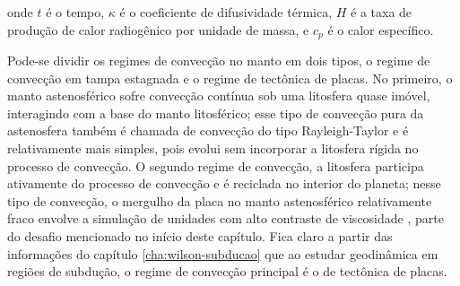 \noindent onde $t$ é o tempo, $\kappa$ é o coeficiente de difusividade térmica, $H$ é a taxa de produção de calor radiogênico por unidade de massa, e $c_p$ é o calor específico.

Pode-se dividir os regimes de convecção no manto em dois tipos, o regime de convecção em tampa estagnada e o regime de tectônica de placas. No primeiro, o manto astenosférico sofre convecção contínua sob uma litosfera quase imóvel, interagindo com a base do manto litosférico; esse tipo de convecção pura da astenosfera também é chamada de convecção do tipo Rayleigh-Taylor e é relativamente mais simples, pois evolui sem incorporar a litosfera rígida no processo de convecção. O segundo regime de convecção, a litosfera participa ativamente do processo de convecção e é reciclada no interior do planeta; nesse tipo de convecção, o mergulho da placa no manto astenosférico relativamente fraco envolve a simulação de unidades com alto contraste de viscosidade \citep{korenaga2013initiation,gerya2019introduction}, parte do desafio mencionado no início deste capítulo. Fica claro a partir das informações do capítulo \ref{cha:wilson-subducao} que ao estudar geodinâmica em regiões de subdução, o regime de convecção principal é o de tectônica de placas.


